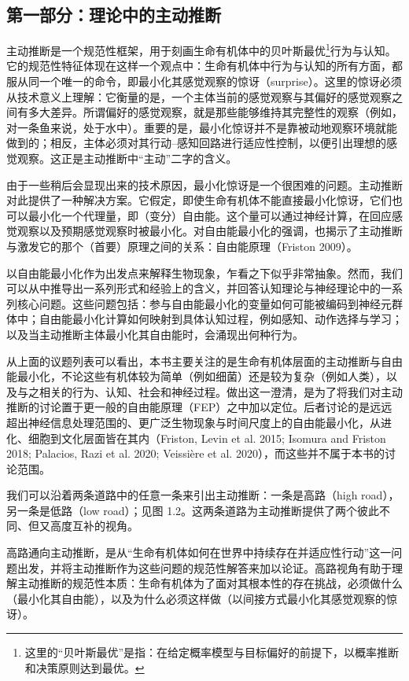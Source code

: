 \subsection{第一部分：理论中的主动推断}

主动推断是一个规范性框架，用于刻画生命有机体中的贝叶斯最优\footnote{这里的``贝叶斯最优''是指：在给定概率模型与目标偏好的前提下，以概率推断和决策原则达到最优。}行为与认知。它的规范性特征体现在这样一个观点中：生命有机体中行为与认知的所有方面，都服从同一个唯一的命令，即最小化其感觉观察的惊讶（surprise）。这里的惊讶必须从技术意义上理解：它衡量的是，一个主体当前的感觉观察与其偏好的感觉观察之间有多大差异。所谓偏好的感觉观察，就是那些能够维持其完整性的观察（例如，对一条鱼来说，处于水中）。重要的是，最小化惊讶并不是靠被动地观察环境就能做到的；相反，主体必须对其行动--感知回路进行适应性控制，以便引出理想的感觉观察。这正是主动推断中``主动''二字的含义。

由于一些稍后会显现出来的技术原因，最小化惊讶是一个很困难的问题。主动推断对此提供了一种解决方案。它假定，即使生命有机体不能直接最小化惊讶，它们也可以最小化一个代理量，即（变分）自由能。这个量可以通过神经计算，在回应感觉观察以及预期感觉观察时被最小化。对自由能最小化的强调，也揭示了主动推断与激发它的那个（首要）原理之间的关系：自由能原理（Friston 2009）。

以自由能最小化作为出发点来解释生物现象，乍看之下似乎非常抽象。然而，我们可以从中推导出一系列形式和经验上的含义，并回答认知理论与神经理论中的一系列核心问题。这些问题包括：参与自由能最小化的变量如何可能被编码到神经元群体中；自由能最小化计算如何映射到具体认知过程，例如感知、动作选择与学习；以及当主动推断主体最小化其自由能时，会涌现出何种行为。

从上面的议题列表可以看出，本书主要关注的是生命有机体层面的主动推断与自由能最小化，不论这些有机体较为简单（例如细菌）还是较为复杂（例如人类），以及与之相关的行为、认知、社会和神经过程。做出这一澄清，是为了将我们对主动推断的讨论置于更一般的自由能原理（FEP）之中加以定位。后者讨论的是远远超出神经信息处理范围的、更广泛生物现象与时间尺度上的自由能最小化，从进化、细胞到文化层面皆在其内（Friston, Levin et al. 2015; Isomura and Friston 2018; Palacios, Razi et al. 2020; Veissière et al. 2020），而这些并不属于本书的讨论范围。

我们可以沿着两条道路中的任意一条来引出主动推断：一条是高路（high road），另一条是低路（low road）；见图 1.2。这两条道路为主动推断提供了两个彼此不同、但又高度互补的视角。

高路通向主动推断，是从``生命有机体如何在世界中持续存在并适应性行动''这一问题出发，并将主动推断作为这些问题的规范性解答来加以论证。高路视角有助于理解主动推断的规范性本质：生命有机体为了面对其根本性的存在挑战，必须做什么（最小化其自由能），以及为什么必须这样做（以间接方式最小化其感觉观察的惊讶）。

